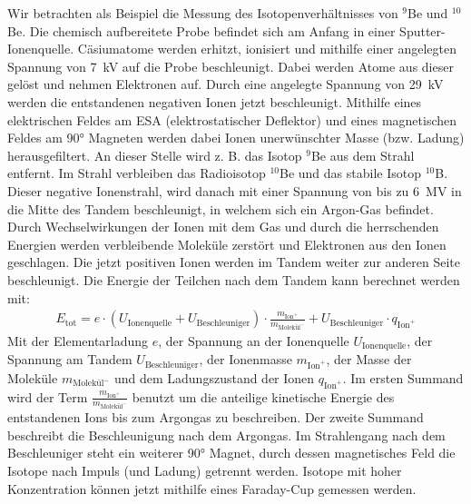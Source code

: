Wir betrachten als Beispiel die Messung des Isotopenverhältnisses von $^{9}$Be und $^{10}$Be.
Die chemisch aufbereitete Probe befindet sich am Anfang in einer Sputter-Ionenquelle.
Cäsiumatome werden erhitzt, ionisiert und mithilfe einer angelegten Spannung von \SI{7}{\kilo\volt} auf die Probe beschleunigt.
Dabei werden Atome aus dieser gelöst und nehmen Elektronen auf.
Durch eine angelegte Spannung von \SI{29}{\kilo\volt} werden die entstandenen negativen Ionen jetzt beschleunigt.
Mithilfe eines elektrischen Feldes am ESA (elektrostatischer Deflektor) und eines magnetischen Feldes am \ang{90} Magneten werden dabei Ionen unerwünschter Masse (bzw. Ladung) herausgefiltert.
An dieser Stelle wird z. B. das Isotop  $^{9}$Be aus dem Strahl entfernt.
Im Strahl verbleiben das Radioisotop $^{10}$Be und das stabile Isotop $^{10}$B.
Dieser negative Ionenstrahl, wird danach mit einer Spannung von bis zu \SI{6}{\mega\volt} in die Mitte des Tandem beschleunigt, in welchem sich ein Argon-Gas befindet.
Durch Wechselwirkungen der Ionen mit dem Gas und durch die herrschenden Energien werden verbleibende Moleküle zerstört und Elektronen aus den Ionen geschlagen.
Die jetzt positiven Ionen werden im Tandem weiter zur anderen Seite beschleunigt.
Die Energie der Teilchen nach dem Tandem kann berechnet werden mit:
\begin{gather}
    E_{\text{tot}} = e \cdot (U_{\text{Ionenquelle}} + U_{\text{Beschleuniger}}) \cdot \frac{m_{\text{Ion}^{+}}}{m_{\text{Molekül}^{-}}} + U_{\text{Beschleuniger}} \cdot q_{\text{Ion}^{+}}
    \label{Theo_Energie_nach_Beschleuniger}
\end{gather}
Mit der Elementarladung $e$, der Spannung an der Ionenquelle $U_{\text{Ionenquelle}}$, der Spannung am Tandem $U_{\text{Beschleuniger}}$, der Ionenmasse $m_{\text{Ion}^{+}}$, der Masse der Moleküle $m_{\text{Molekül}^{-}}$ und dem Ladungszustand der Ionen $q_{\text{Ion}^{+}}$.
Im ersten Summand wird der Term $\frac{m_{\text{Ion}^{+}}}{m_{\text{Molekül}^{-}}}$ benutzt um die anteilige kinetische Energie des entstandenen Ions bis zum Argongas zu beschreiben.
Der zweite Summand beschreibt die Beschleunigung nach dem Argongas.
Im Strahlengang nach dem Beschleuniger steht ein weiterer \ang{90} Magnet, durch dessen magnetisches Feld die Isotope nach Impuls (und Ladung) getrennt werden.
Isotope mit hoher Konzentration können jetzt mithilfe eines Faraday-Cup gemessen werden.

